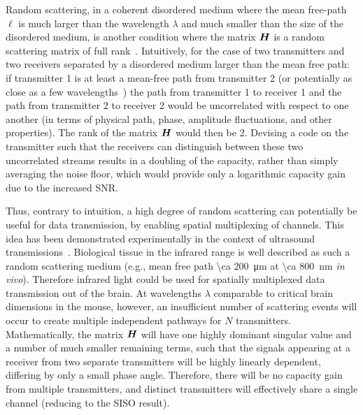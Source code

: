 Random scattering, in a coherent disordered medium where the mean free-path $\ell$ is much larger than the wavelength $\lambda$ and much smaller than the size of the disordered medium, is another condition where the matrix $\mat{H}$ is a random scattering matrix of full rank~\cite{moustakas00,popoff10}.
Intuitively, for the case of two transmitters and two receivers separated by a disordered medium larger than the mean free path:
if transmitter 1 is at least a mean-free path from transmitter 2 (or potentially as close as a few wavelengths~\cite{berkovits91}) the path from transmitter 1 to receiver 1 and the path from transmitter 2 to receiver 2 would be uncorrelated with respect to one another (in terms of physical path, phase, amplitude fluctuations, and other properties).
The rank of the matrix $\mat{H}$ would then be 2.
Devising a code on the transmitter such that the receivers can distinguish between these two uncorrelated streams results in a doubling of the capacity, rather than simply averaging the noise floor, which would provide only a logarithmic capacity gain due to the increased SNR.

Thus, contrary to intuition, a high degree of random scattering can potentially be useful for data transmission, by enabling spatial multiplexing of channels.
This idea has been demonstrated experimentally in the context of ultrasound transmissions~\cite{derode03}.
Biological tissue in the infrared range is well described as such a random scattering medium (e.g., mean free path \SI{\ca 200}{\micro\meter} at \SI{\ca 800}{\nano\meter} \emph{in vivo}).
Therefore infrared light could be used for spatially multiplexed data transmission out of the brain.
At wavelengths $\lambda$ comparable to critical brain dimensions in the mouse, however, an insufficient number of scattering events will occur to create multiple independent pathways for $N$ transmitters.
Mathematically, the matrix $\mat{H}$ will have one highly dominant singular value and a number of much smaller remaining terms, such that the signals appearing at a receiver from two separate transmitters will be highly linearly dependent, differing by only a small phase angle.
Therefore, there will be no capacity gain from multiple transmitters, and distinct transmitters will effectively share a single channel (reducing to the SISO result).

